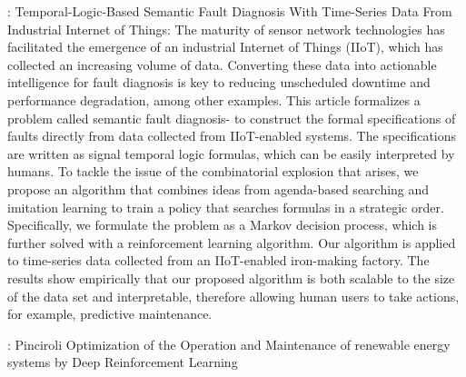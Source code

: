 \documentclass{article}
\begin{document}
\cite{Chen-2021-Temporal}: Temporal-Logic-Based Semantic Fault Diagnosis With Time-Series Data From Industrial Internet of Things:
The maturity of sensor network technologies has facilitated the emergence of an industrial Internet of Things (IIoT), which has collected an increasing volume of data. Converting these data into actionable intelligence for fault diagnosis is key to reducing unscheduled downtime and performance degradation, among other examples. This article formalizes a problem called semantic fault diagnosis- to construct the formal specifications of faults directly from data collected from IIoT-enabled systems. The specifications are written as signal temporal logic formulas, which can be easily interpreted by humans. To tackle the issue of the combinatorial explosion that arises, we propose an algorithm that combines ideas from agenda-based searching and imitation learning to train a policy that searches formulas in a strategic order. Specifically, we formulate the problem as a Markov decision process, which is further solved with a reinforcement learning algorithm. Our algorithm is applied to time-series data collected from an IIoT-enabled iron-making factory. The results show empirically that our proposed algorithm is both scalable to the size of the data set and interpretable, therefore allowing human users to take actions, for example, predictive maintenance.

\cite{Pinciroli2022-752}: Pinciroli Optimization of the Operation and Maintenance of renewable energy systems by Deep Reinforcement Learning

\end{document}
